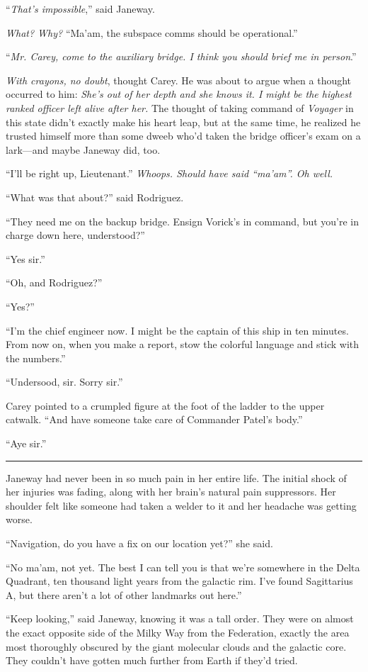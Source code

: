 \documentclass[twoside,letterpaper,12pt]{memoir}
\begin{document}
``\textit{That's impossible},'' said Janeway.

\textit{What? Why?} ``Ma'am, the subspace comms should be operational.''

``\textit{Mr. Carey, come to the auxiliary bridge. I think you should brief me in person}.''

\textit{With crayons, no doubt}, thought Carey. He was about to argue when a thought occurred to him: \textit{She's out of her depth and she knows it. I might be the highest ranked officer left alive after her.} The thought of taking command of \textit{Voyager} in this state didn't exactly make his heart leap, but at the same time, he realized he trusted himself more than some dweeb who'd taken the bridge officer's exam on a lark---and maybe Janeway did, too.

``I'll be right up, Lieutenant.'' \textit{Whoops. Should have said ``ma'am''. Oh well.}

``What was that about?'' said Rodriguez.

``They need me on the backup bridge. Ensign Vorick’s in command, but you’re in charge down here, understood?''

``Yes sir.''

``Oh, and Rodriguez?''

``Yes?''

``I’m the chief engineer now. I might be the captain of this ship in ten minutes. From now on, when you make a report, stow the colorful language and stick with the numbers.''

``Undersood, sir. Sorry sir.''

Carey pointed to a crumpled figure at the foot of the ladder to the upper catwalk. ``And have someone take care of Commander Patel’s body.''

``Aye sir.''

\fancybreak{\rule{3cm}{0.4 pt}}
Janeway had never been in so much pain in her entire life. The initial shock of her injuries was fading, along with her brain's natural pain suppressors. Her shoulder felt like someone had taken a welder to it and her headache was getting worse.

``Navigation, do you have a fix on our location yet?'' she said.

``No ma'am, not yet. The best I can tell you is that we're somewhere in the Delta Quadrant, ten thousand light years from the galactic rim. I've found Sagittarius A, but there aren't a lot of other landmarks out here.''

``Keep looking,'' said Janeway, knowing it was a tall order. They were on almost the exact opposite side of the Milky Way from the Federation, exactly the area most thoroughly obscured by the giant molecular clouds and the galactic core. They couldn't have gotten much further from Earth if they'd tried.
\end{document}
